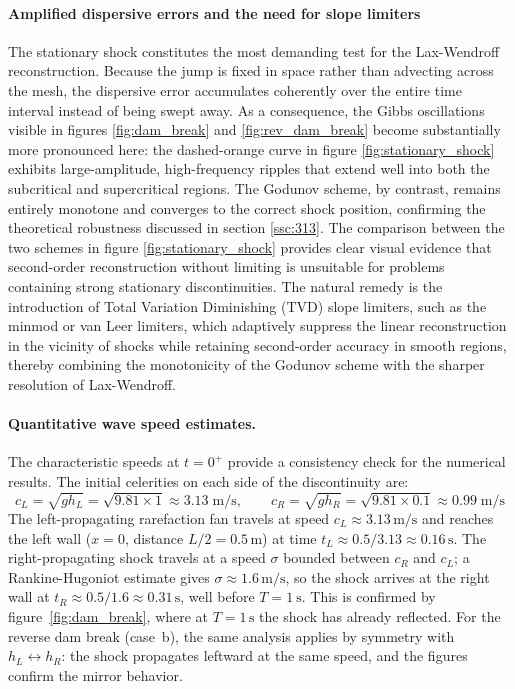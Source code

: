 \paragraph{Amplified dispersive errors and the need for slope limiters}
The stationary shock constitutes the most demanding test for the Lax-Wendroff reconstruction. Because the jump is fixed in space rather than advecting across the mesh, the dispersive error accumulates coherently over the entire time interval instead of being swept away. As a consequence, the Gibbs oscillations visible in figures \ref{fig:dam_break} and \ref{fig:rev_dam_break} become substantially more pronounced here: the dashed-orange curve in figure \ref{fig:stationary_shock} exhibits large-amplitude, high-frequency ripples that extend well into both the subcritical and supercritical regions. The Godunov scheme, by contrast, remains entirely monotone and converges to the correct shock position, confirming the theoretical robustness discussed in section \ref{ssc:313}. The comparison between the two schemes in figure \ref{fig:stationary_shock} provides clear visual evidence that second-order reconstruction without limiting is unsuitable for problems containing strong stationary discontinuities. The natural remedy is the introduction of Total Variation Diminishing (TVD) slope limiters, such as the minmod or van Leer limiters, which adaptively suppress the linear reconstruction in the vicinity of shocks while retaining second-order accuracy in smooth regions, thereby combining the monotonicity of the Godunov scheme with the sharper resolution of Lax-Wendroff.

\paragraph{Quantitative wave speed estimates.}
The characteristic speeds at $t = 0^+$ provide a consistency check 
for the numerical results. The initial celerities on each side of 
the discontinuity are:
%
\begin{equation}
    c_L = \sqrt{g h_L} = \sqrt{9.81 \times 1} \approx 3.13\;\mathrm{m/s},
    \qquad
    c_R = \sqrt{g h_R} = \sqrt{9.81 \times 0.1} \approx 0.99\;\mathrm{m/s}
    \label{eq:celerities_dambreak}
\end{equation}
%
The left-propagating rarefaction fan travels at speed $c_L \approx 
3.13\,\mathrm{m/s}$ and reaches the left wall 
($x = 0$, distance $L/2 = 0.5\,\mathrm{m}$) at time 
$t_L \approx 0.5/3.13 \approx 0.16\,\mathrm{s}$. 
The right-propagating shock travels at a speed $\sigma$ bounded 
between $c_R$ and $c_L$; a Rankine-Hugoniot estimate gives 
$\sigma \approx 1.6\,\mathrm{m/s}$, so the shock arrives at 
the right wall at $t_R \approx 0.5/1.6 \approx 0.31\,\mathrm{s}$, 
well before $T = \SI{1}{\second}$. This is confirmed by 
figure~\ref{fig:dam_break}, where at $T = 1\,\mathrm{s}$ the shock 
has already reflected. For the reverse dam break (case~b), the same 
analysis applies by symmetry with $h_L \leftrightarrow h_R$: the shock 
propagates leftward at the same speed, and the figures confirm 
the mirror behavior.